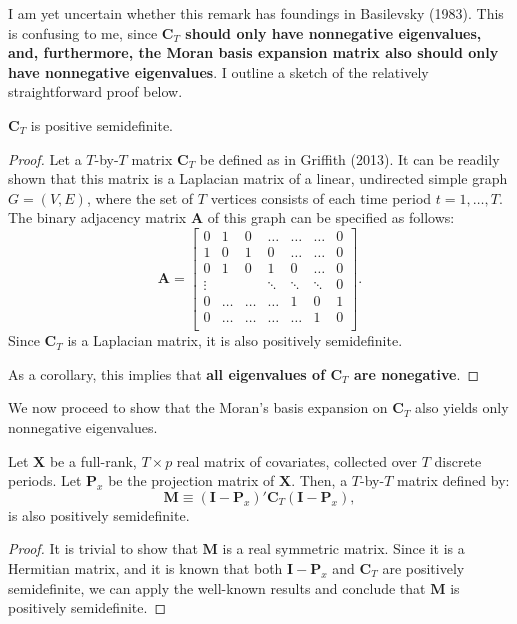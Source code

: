 \documentclass[12pt]{article}
\newenvironment{theorem}[2][Proposition]
{\begin{trivlist}
\item[\hskip \labelsep {\bfseries #1}\hskip \labelsep {\bfseries #2.}]
}
{\end{trivlist}}
\begin{document}
I am yet uncertain whether this remark has foundings in Basilevsky (1983). This is confusing to me, since {\bf $\mathbf{C}_T$ should only have nonnegative eigenvalues, and, furthermore, the Moran basis expansion matrix also should only have nonnegative eigenvalues}. I outline a sketch of the relatively straightforward proof below.

\begin{theorem}{1}
$\mathbf{C}_T$ is positive semidefinite.
\end{theorem}

\begin{proof}
Let a $T$-by-$T$ matrix $\mathbf{C}_T$ be defined as in Griffith (2013). It can be readily shown that this matrix is a Laplacian matrix of a linear, undirected simple graph $G=(V,E)$, where the set of $T$ vertices consists of each time period $t=1,\ldots, T$. The binary adjacency matrix $\mathbf{A}$ of this graph can be specified as follows:
$$
\mathbf{A} = \left[
\begin{array}{ccccccc}
0 & 1 & 0 & \dots & \dots & \dots & 0\\
1 & 0 & 1 & 0 & \dots & \dots & 0\\
0 & 1 & 0 & 1 & 0 & \dots & 0\\
\vdots & & & \ddots & \ddots & \ddots & 0\\
0 & \dots & \dots & \dots & 1 & 0 & 1\\
0 & \dots & \dots & \dots & \dots & 1 & 0\\
\end{array}
\right].
$$
Since $\mathbf{C}_T$ is a Laplacian matrix, it is also positively semidefinite. 

As a corollary, this implies that {\bf all eigenvalues of $\mathbf{C}_T$ are nonegative}.
\end{proof}

We now proceed to show that the Moran's basis expansion on $\mathbf{C}_T$ also yields only nonnegative eigenvalues.

\begin{theorem}{2}
Let $\mathbf{X}$ be a full-rank, $T\times p$ real matrix of covariates, collected over $T$ discrete periods. Let $\mathbf{P}_x$ be the projection matrix of $\mathbf{X}$. Then, a $T$-by-$T$ matrix defined by:
$$\mathbf{M} \equiv (\mathbf{I}-\mathbf{P}_x)'\mathbf{C}_T(\mathbf{I}-\mathbf{P}_x),$$
is also positively semidefinite.
\end{theorem}

\begin{proof}
It is trivial to show that $\mathbf{M}$ is a real symmetric matrix. Since it is a Hermitian matrix, and it is known that both $\mathbf{I}-\mathbf{P}_x$ and $\mathbf{C}_T$ are positively semidefinite, we can apply the well-known results and conclude that $\mathbf{M}$ is positively semidefinite.
\end{proof}
\end{document}
